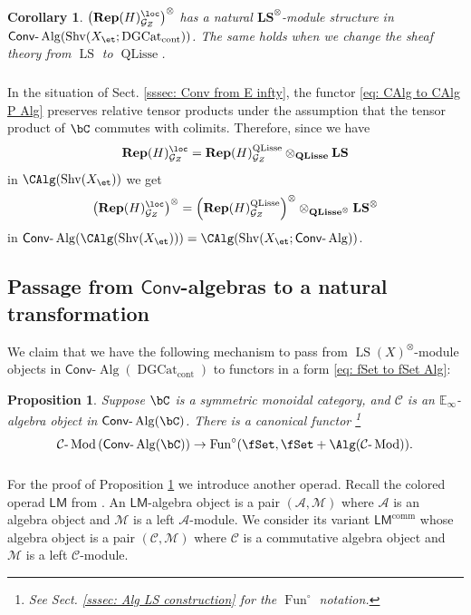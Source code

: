 \documentclass[10pt]{amsart}
\newcommand{\sssec}{\subsubsection}
\newtheorem{prop}[subsubsection]{Proposition}
\newtheorem{cor}[subsubsection]{Corollary}
\theoremstyle{remark}
\newcommand{\E}{\mathbb{E}}
\newcommand{\on}{\operatorname}
\newcommand{\cA}{\mathcal{A}}
\newcommand{\cC}{\mathcal{C}}
\newcommand{\cG}{\mathcal{G}}
\newcommand{\cM}{\mathcal{M}}
\newcommand{\DGcat}{\on{DGCat}_{\on{cont}}}
\newcommand{\lMod}{\text{-}\on{Mod}}
\newcommand{\lAlg}{\text{-}\on{Alg}}
\newcommand{\Shv}{\on{Shv}}
\newcommand{\LS}{\on{LS}}
\newcommand{\QLisse}{\on{QLisse}}
\newcommand{\Fun}{\on{Fun}}
\newcommand{\Conv}{\mathsf{Conv}}
\newcommand{\LM}{\mathsf{LM}}
\newcommand{\LMcomm}{\mathsf{LM}^{\on{comm}}}
\begin{document}
\begin{cor}
    $\left(\mathbf{Rep}(H)^{\loc}_{\cG_Z}\right)^{\otimes}$ has a natural $\mathbf{LS}^{\otimes}$-module structure in $\Conv\lAlg(\Shv(X_{\et};\DGcat))$. The same holds when we change the sheaf theory from $\LS$ to $\QLisse$.
\end{cor}

\sssec{}\label{sssec: rel tensor prod}
In the situation of Sect. \ref{sssec: Conv from E infty}, the functor \eqref{eq: CAlg to CAlg P Alg} preserves relative tensor products under the assumption that the tensor product of $\bC$ commutes with  colimits. Therefore, since we have
\[\textbf{Rep}(H)^{\loc}_{\cG_Z}=\textbf{Rep}(H)^{\QLisse}_{\cG_Z}\otimes_{\textbf{QLisse}}\textbf{LS}\]
in $\CAlg(\Shv(X_{\et}))$ we get
\[\left(\textbf{Rep}(H)^{\loc}_{\cG_Z}\right)^{\otimes}= \left(\textbf{Rep}(H)^{\QLisse}_{\cG_Z}\right)^{\otimes}\otimes_{\textbf{QLisse}^{\otimes}}\textbf{LS}^{\otimes}\]
in $\Conv\lAlg(\CAlg(\Shv(X_{\et})))= \CAlg(\Shv(X_{\et};\Conv\lAlg))$.

\subsection{Passage from $\Conv$-algebras to a natural transformation}\label{ssec: construction of a nat transf}\label{ssec: passage to nat transf}
We claim that we have the following mechanism to pass from $\LS(X)^{\otimes}$-module objects in $\Conv\lAlg(\DGcat)$ to functors in a form \eqref{eq: fSet to fSet Alg}:
\begin{prop}\label{prop: module in Conv to fSet Alg}
Suppose $\bC$ is a symmetric monoidal category, and $\cC$ is an $\E_{\infty}$-algebra object in $\Conv\lAlg(\bC)$.
There is a canonical functor \footnote{See Sect. \ref{sssec: Alg LS construction} for the $\Fun^{\circ}$ notation.}
\begin{equation}\label{eq: passage functor}
    \cC\lMod\left(\Conv\lAlg(\bC)\right)\rightarrow \Fun^{\circ}(\fSet, \fSet + \Alg(\cC\lMod)).
\end{equation}
\end{prop}




\sssec{}\label{sssec: LMcomm}
For the proof of Proposition \ref{prop: module in Conv to fSet Alg} we introduce another operad. Recall the colored operad $\LM$ from \cite[Sect. 4.2.1]{HA}. An $\LM$-algebra object is a pair $(\cA,\cM)$ where $\cA$ is an algebra object and $\cM$ is a left $\cA$-module. We consider its variant $\LMcomm$ whose algebra object is a pair $(\cC,\cM)$ where $\cC$ is a commutative algebra object and $\cM$ is a left $\cC$-module.
\end{document}
